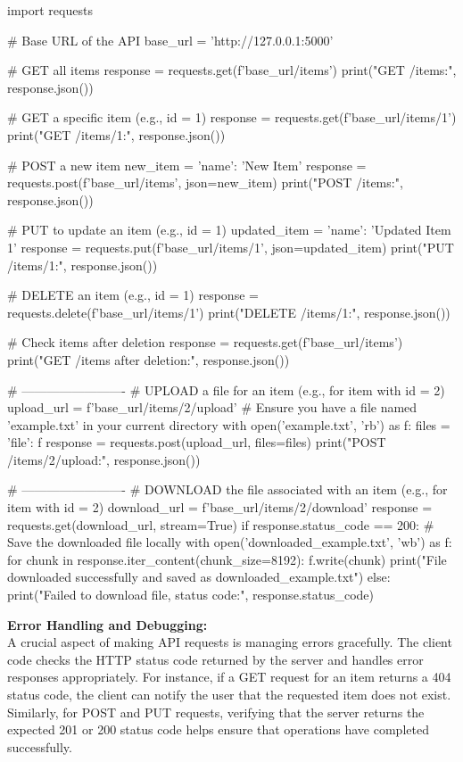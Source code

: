 \begin{codeonly}{}
import requests

# Base URL of the API
base_url = 'http://127.0.0.1:5000'

# GET all items
response = requests.get(f'{base_url}/items')
print("GET /items:", response.json())

# GET a specific item (e.g., id = 1)
response = requests.get(f'{base_url}/items/1')
print("GET /items/1:", response.json())

# POST a new item
new_item = {'name': 'New Item'}
response = requests.post(f'{base_url}/items', json=new_item)
print("POST /items:", response.json())

# PUT to update an item (e.g., id = 1)
updated_item = {'name': 'Updated Item 1'}
response = requests.put(f'{base_url}/items/1', json=updated_item)
print("PUT /items/1:", response.json())

# DELETE an item (e.g., id = 1)
response = requests.delete(f'{base_url}/items/1')
print("DELETE /items/1:", response.json())

# Check items after deletion
response = requests.get(f'{base_url}/items')
print("GET /items after deletion:", response.json())

# -------------------------
# UPLOAD a file for an item (e.g., for item with id = 2)
upload_url = f'{base_url}/items/2/upload'
# Ensure you have a file named 'example.txt' in your current directory
with open('example.txt', 'rb') as f:
    files = {'file': f}
    response = requests.post(upload_url, files=files)
    print("POST /items/2/upload:", response.json())

# -------------------------
# DOWNLOAD the file associated with an item (e.g., for item with id = 2)
download_url = f'{base_url}/items/2/download'
response = requests.get(download_url, stream=True)
if response.status_code == 200:
    # Save the downloaded file locally
    with open('downloaded_example.txt', 'wb') as f:
        for chunk in response.iter_content(chunk_size=8192):
            f.write(chunk)
    print("File downloaded successfully and saved as downloaded_example.txt")
else:
    print("Failed to download file, status code:", response.status_code)
\end{codeonly}


\textbf{Error Handling and Debugging:}\\
A crucial aspect of making API requests is managing errors gracefully. The client code checks the HTTP status code returned by the server and handles error responses appropriately. For instance, if a GET request for an item returns a 404 status code, the client can notify the user that the requested item does not exist. Similarly, for POST and PUT requests, verifying that the server returns the expected 201 or 200 status code helps ensure that operations have completed successfully.

